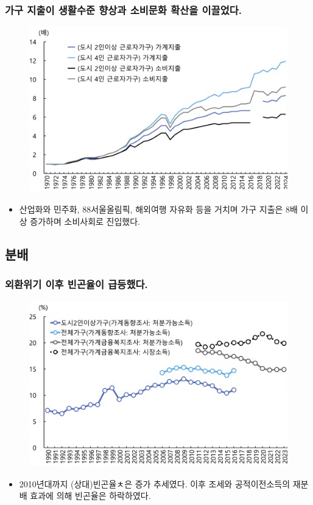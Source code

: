 \documentclass[aspectratio=169,xcolor=dvipsnames,handout]{beamer}
\begin{document}
\begin{frame}[<+->]
\frametitle{가구 지출이 생활수준 향상과 소비문화 확산을 이끌었다.}
    \begin{figure}
        \centering
        \includegraphics[width=.5\textwidth]{pic/fig_ineq_05.png}
    \end{figure}
    \begin{itemize}
        \item 산업화와 민주화, 88서울올림픽, 해외여행 자유화 등을 거치며 가구 지출은 8배 이상 증가하며 소비사회로 진입했다.
    \end{itemize}
\end{frame}

\subsection{분배}
\begin{frame}[<+->]
\frametitle{외환위기 이후 빈곤율이 급등했다.}
    \begin{figure}
        \centering
        \includegraphics[width=.5\textwidth]{pic/fig_ineq_07.png}
    \end{figure}
    \begin{itemize}
        \item 2010년대까지 (상대)빈곤율ㅊ은 증가 추세였다. 이후 조세와 공적이전소득의 재분배 효과에 의해 빈곤율은 하락하였다.
    \end{itemize}
\end{frame}
\end{document}
